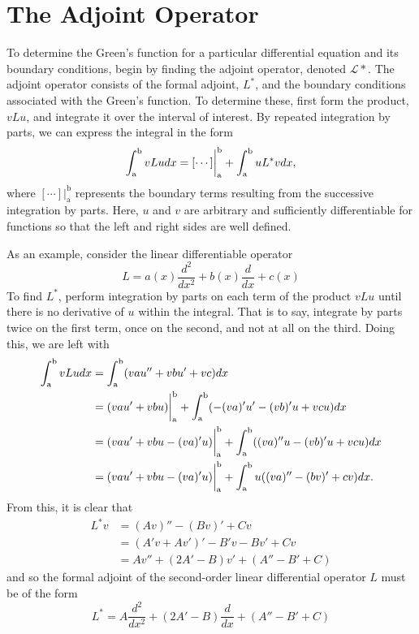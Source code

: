 \section{The Adjoint Operator}
To determine the Green's function for a particular differential equation and its boundary conditions, begin by finding the adjoint operator, denoted \(\mathcal{L*}\). The adjoint operator consists of the formal adjoint, \(L^*\), and the boundary conditions associated with the Green's function. To determine these, first form the product, \(vLu\), and integrate it over the interval of interest. By repeated integration by parts, we can express the integral in the form
\begin{equation}
	\int_\mathrm{a}^\mathrm{b} vLu dx = [\cdots]\biggr\rvert_\mathrm{a}^\mathrm{b} + \int_\mathrm{a}^\mathrm{b} uL^*v dx,
\end{equation}
where \([\cdots]\biggr\rvert_\mathrm{a}^\mathrm{b}\) represents the boundary terms resulting from the successive integration by parts. Here, \(u\) and \(v\) are arbitrary and sufficiently differentiable for functions so that the left and right sides are well defined. 

As an example, consider the linear differentiable operator
\begin{equation}
	L= a(x) \frac{d^2}{dx^2} + b(x)\frac{d}{dx} + c(x)
\end{equation}
To find \(L^*\), perform integration by parts on each term of the product \(vLu\) until there is no derivative of \(u\) within the integral. That is to say, integrate by parts twice on the first term, once on the second, and not at all on the third. Doing this, we are left with
\begin{equation}
	\begin{split}
		\int_\mathrm{a}^\mathrm{b} vLu dx &= \int_\mathrm{a}^\mathrm{b} (vau''+ vbu' + vc)dx\\
		&=(vau'+vbu)\biggr\rvert_\mathrm{a}^\mathrm{b} + \int_\mathrm{a}^\mathrm{b} (-(va)'u'-(vb)'u+vcu)dx\\
		&=(vau'+vbu-(va)'u)\biggr\rvert_\mathrm{a}^\mathrm{b} + \int_\mathrm{a}^\mathrm{b} ((va)''u-(vb)'u+vcu)dx\\
		&=(vau'+vbu-(va)'u)\biggr\rvert_\mathrm{a}^\mathrm{b} + \int_\mathrm{a}^\mathrm{b} u((va)''-(bv)'+cv)dx.
	\end{split}
\end{equation}
From this, it is clear that 
\begin{equation}
	\begin{split}
		L^*v &= (Av)''-(Bv)'+Cv\\
		     &= (A'v+Av')'-B'v-Bv'+Cv\\
		     &= Av''+(2A'-B)v'+(A''-B'+C)
	\end{split}
\end{equation}
and so the formal adjoint of the second-order linear differential operator \(L\) must be of the form
\begin{equation}
	L^*=A\frac{d^2}{dx^2} + (2A'-B)\frac{d}{dx}+(A''-B'+C)
\end{equation}


